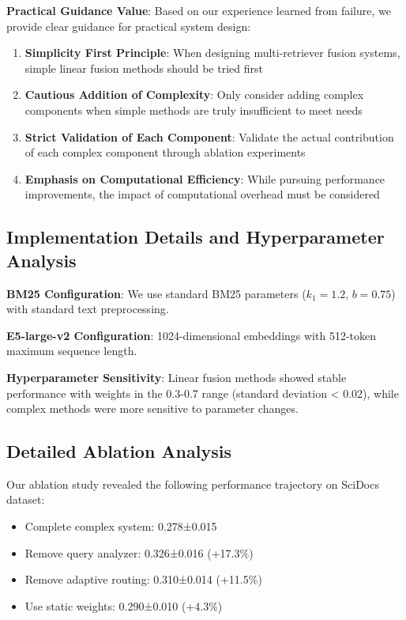 \documentclass[letterpaper]{article} %
\begin{document}
\textbf{Practical Guidance Value}:
Based on our experience learned from failure, we provide clear guidance for practical system design:
\begin{enumerate}
\item \textbf{Simplicity First Principle}: When designing multi-retriever fusion systems, simple linear fusion methods should be tried first
\item \textbf{Cautious Addition of Complexity}: Only consider adding complex components when simple methods are truly insufficient to meet needs
\item \textbf{Strict Validation of Each Component}: Validate the actual contribution of each complex component through ablation experiments
\item \textbf{Emphasis on Computational Efficiency}: While pursuing performance improvements, the impact of computational overhead must be considered
\end{enumerate}

\subsection{Implementation Details and Hyperparameter Analysis}

\textbf{BM25 Configuration}: We use standard BM25 parameters ($k_1 = 1.2$, $b = 0.75$) with standard text preprocessing.

\textbf{E5-large-v2 Configuration}: 1024-dimensional embeddings with 512-token maximum sequence length.

\textbf{Hyperparameter Sensitivity}: Linear fusion methods showed stable performance with weights in the 0.3-0.7 range (standard deviation < 0.02), while complex methods were more sensitive to parameter changes.

\subsection{Detailed Ablation Analysis}

Our ablation study revealed the following performance trajectory on SciDocs dataset:
\begin{itemize}
\item Complete complex system: 0.278±0.015
\item Remove query analyzer: 0.326±0.016 (+17.3\%)
\item Remove adaptive routing: 0.310±0.014 (+11.5\%)
\item Use static weights: 0.290±0.010 (+4.3\%)
\end{itemize}
\end{document}

